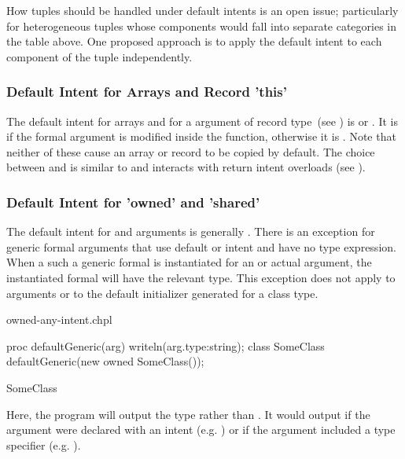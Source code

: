 \begin{openissue}
How tuples should be handled under default intents is an open issue;
particularly for heterogeneous tuples whose components would fall into
separate categories in the table above.  One proposed approach is to
apply the default intent to each component of the tuple independently.
\end{openissue}

\subsubsection{Default Intent for Arrays and Record 'this'}
\label{Default_Intent_for_Arrays_and_Record_this}

The default intent for arrays and for a  argument of record
type~(see ) is  or . It is  if the formal argument is modified inside the
function, otherwise it is .  Note that neither of these
cause an array or record to be copied by default.  The choice between
 and  is similar to and interacts with return
intent overloads (see ).

\subsubsection{Default Intent for 'owned' and 'shared'}
\label{Default_Intent_for_owned_and_shared}

The default intent for  and  arguments is
generally . There is an exception for generic formal arguments
that use default or  intent and have no type expression.
When a such a generic formal is instantiated for an  or
 actual argument, the instantiated formal will have the
relevant  type. This exception does not apply to 
arguments or to the default initializer generated for a class type.

\begin{chapelexample}{owned-any-intent.chpl}
\begin{chapel}
proc defaultGeneric(arg) {
  writeln(arg.type:string);
}
class SomeClass { }
defaultGeneric(new owned SomeClass());
\end{chapel}
\begin{chapeloutput}
SomeClass
\end{chapeloutput}
Here, the program will output the type  rather
than . It would output  if
the argument were declared with an  intent (e.g. ) or if
the argument included a type specifier (e.g. ).
\end{chapelexample}

